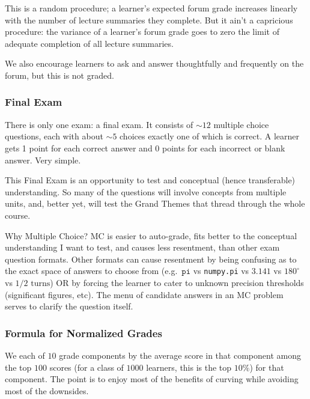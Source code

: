 \documentclass[12pt]{article}
\begin{document}
        This is a random procedure; a learner's expected forum grade increases
        linearly with the number of lecture summaries they complete.  But it
        ain't a capricious procedure: the variance of a learner's forum grade
        goes to zero the limit of adequate completion of all lecture summaries.

        We also encourage learners to ask and answer thoughtfully and
        frequently on the forum, but this is not graded.

      \subsubsection*{Final Exam}
        There is only one exam: a final exam.  It consists of $\sim 12$
        multiple choice questions, each with about $\sim 5$ choices exactly one
        of which is correct.  A learner gets 1 point for each correct answer
        and 0 points for each incorrect or blank answer.  Very simple.

        This Final Exam is an opportunity to test  and conceptual (hence transferable) understanding.  So many
        of the questions will involve concepts from multiple units, and, better
        yet, will test the Grand Themes that thread through the whole course.

        Why Multiple Choice?  MC is easier to auto-grade, fits better to the
        conceptual understanding I want to test, and causes less resentment,
        than other exam question formats.  Other formats can cause resentment
        by being confusing as to the exact space of answers to choose from
        (e.g.\ $\texttt{pi}$ vs \texttt{numpy.pi} vs $3.141$ vs $180^\circ$ vs
        $1/2 \text{~turns}$) OR by forcing the learner to cater to unknown
        precision thresholds (significant figures, etc).  The menu of candidate
        answers in an MC problem serves to clarify the question itself.

      \subsubsection*{Formula for Normalized Grades}
        We  each of $10$ grade components by the average
        score in that component among the top $100$ scores (for a class of
        $1000$ learners, this is the top $10\%$) for that component.  The point
        is to enjoy most of the benefits of curving while avoiding most of the
        downsides.
\end{document}

